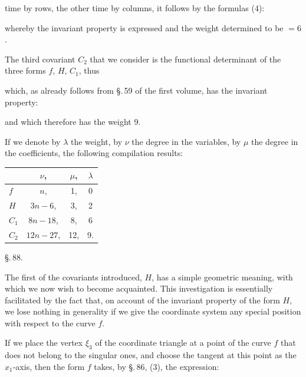 time by rows, the other time by columns, it follows by the
formulas (4):


whereby the invariant property is expressed and the weight
determined to be $= 6$.

The third covariant $C_2$ that we consider is the functional determinant
 of the three forms $f$, $H$, $C_1$, thus


which, as already follows from \S.\,59 of the first volume, has the
invariant property:


and which therefore has the weight 9.

If we denote by $\lambda$ the weight, by $\nu$ the degree in the
variables, by $\mu$ the degree in the coefficients, the following
compilation results:

\begin{center}
\begin{tabular}{lccc}
 & $\nu$, & $\mu$, & $\lambda$ \\
\hline
$f$ & $n$, & 1, & 0 \\
$H$ & $3n-6$, & 3, & 2 \\
$C_1$ & $8n-18$, & 8, & 6 \\
$C_2$ & $12n-27$, & 12, & 9.
\end{tabular}
\end{center}

\begin{center}
\S.\,88.

\end{center}

The first of the covariants introduced, $H$, has a simple
geometric meaning, with which we now wish to become acquainted.
This investigation is essentially facilitated by the fact that,
on account of the invariant property of the form $H$, we lose
nothing in generality if we give the coordinate system any
special position with respect to the curve $f$.

If we place the vertex $\xi_3$ of the coordinate triangle at a
point of the curve $f$ that does not belong to the singular ones, and
choose the tangent at this point as the $x_1$-axis, then the form $f$
takes, by \S.\,86, (3), the expression:

